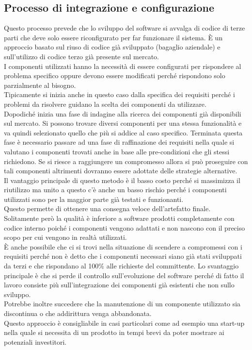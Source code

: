 \subsection{Processo di integrazione e configurazione}
Questo processo prevede che lo sviluppo del software si avvalga di codice di terze parti che deve solo essere riconfigurato per far funzionare il sistema.
È un approccio basato sul riuso di codice già sviluppato (bagaglio aziendale) e sull'utilizzo di codice terzo già presente sul mercato.\\
I componenti utilizzati hanno la necessità di essere configurati per rispondere al problema specifico oppure devono essere modificati perché rispondono solo parzialmente al bisogno.\\
Tipicamente si inizia anche in questo caso dalla specifica dei requisiti perché i problemi da risolvere guidano la scelta dei componenti da utilizzare.\\
Dopodiché inizia una fase di indagine alla ricerca dei componenti già disponibili sul mercato.
Si possono trovare diversi componenti per una stessa funzionalità e va quindi selezionato quello che più si addice al caso specifico.
Terminata questa fase è necessario passare ad una fase di raffinazione dei requisiti nella quale si valutano i componenti trovati anche in base alle pre-condizioni che gli stessi richiedono.
Se si riesce a raggiungere un compromesso allora si può proseguire con tali componenti altrimenti dovranno essere adottate delle strategie alternative.\\
Il vantaggio principale di questo metodo è il basso costo perché si massimizza il riutilizzo ma unito a questo c'è anche un basso rischio perché i componenti utilizzati sono per la maggior parte già testati e funzionanti.\\
Questo permette di ottenere una consegna veloce dell'artefatto finale.\\
Solitamente però la qualità è inferiore a software prodotti completamente con codice interno poiché i componenti vengono adattati e non nascono con il preciso scopo per cui vengono in realtà utilizzati.\\
È anche possibile che ci si trovi nella situazione di scendere a compromessi con i requisiti perché non è detto che i componenti necessari siano già stati sviluppati da terzi e che rispondano al 100\% alle richieste del committente.
Lo svantaggio principale è che si perde il controllo sull'evoluzione del software perché di fatto il lavoro consiste più sull'integrazione dei componenti già esistenti che non sullo sviluppo.\\ Potrebbe inoltre succedere che la manutenzione di un componente utilizzato sia discontinua o che addirittura venga abbandonata.\\
Questo approccio è consigliabile in casi particolari come ad esempio una start-up nella quale si necessita di un prodotto in tempi brevi da poter mostrare ai potenziali investitori.

